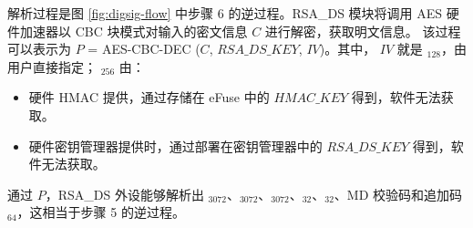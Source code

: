 \documentclass[main\_\_CN.tex]{subfiles}
\begin{document}
\begin{enumerate}
        解析过程是图 \ref{fig:digsig-flow} 中步骤 6 的逆过程。RSA\_DS 模块将调用 AES 硬件加速器以 CBC 块模式对输入的密文信息 \begin{math}C\end{math} 进行解密，获取明文信息。
        该过程可以表示为
        \begin{math}P\end{math} = AES-CBC-DEC (\begin{math}C\end{math}, \begin{math}RSA\_DS\_KEY\end{math}, \begin{math}IV\end{math})。其中， \begin{math}IV\end{math} 就是 \begin{math}[IV]_{128}\end{math}，由用户直接指定； \begin{math}[RSA\_DS\_KEY]_{256}\end{math} 由：
        \begin{itemize}
            \item 硬件 HMAC 提供，通过存储在 eFuse 中的 \begin{math}HMAC\_KEY\end{math} 得到，软件无法获取。
            \item 硬件密钥管理器提供时，通过部署在密钥管理器中的 \begin{math}RSA\_DS\_KEY\end{math} 得到，软件无法获取。
        \end{itemize}
        通过 \begin{math}P\end{math}，RSA\_DS 外设能够解析出 \begin{math}[Y]_{3072}\end{math}、\begin{math}[M]_{3072}\end{math}、\begin{math}[\overline{r}]_{3072}\end{math}、\begin{math}[M^{\prime}]_{32}\end{math}、\begin{math}[L]_{32}\end{math}、MD 校验码和追加码 \begin{math}[\beta]_{64} \end{math}，这相当于步骤 5 的逆过程。


\end{enumerate}
\end{document}
